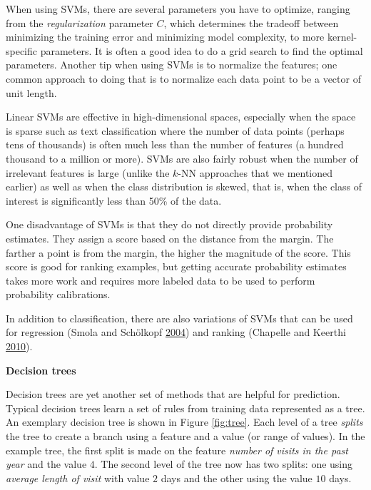 \documentclass[]{krantz}
\begin{document}
When using SVMs, there are several parameters you have to optimize,
ranging from the \emph{regularization} parameter \(C\), which determines
the tradeoff between minimizing the training error and minimizing model
complexity, to more kernel-specific parameters. It is often a good idea
to do a grid search to find the optimal parameters. Another tip when
using SVMs is to normalize the features; one common approach to doing
that is to normalize each data point to be a vector of unit length.

Linear SVMs are effective in high-dimensional spaces, especially when
the space is sparse such as text classification where the number of data
points (perhaps tens of thousands) is often much less than the number of
features (a hundred thousand to a million or more). SVMs are also fairly
robust when the number of irrelevant features is large (unlike the
\(k\)-NN approaches that we mentioned earlier) as well as when the class
distribution is skewed, that is, when the class of interest is
significantly less than 50\% of the data.

One disadvantage of SVMs is that they do not directly provide
probability estimates. They assign a score based on the distance from
the margin. The farther a point is from the margin, the higher the
magnitude of the score. This score is good for ranking examples, but
getting accurate probability estimates takes more work and requires more
labeled data to be used to perform probability calibrations.

In addition to classification, there are also variations of SVMs that
can be used for regression (Smola and Schölkopf
\protect\hyperlink{ref-SmolaRegression04}{2004}) and ranking (Chapelle
and Keerthi \protect\hyperlink{ref-Chapelle2010}{2010}).

\textbf{Decision trees}

Decision trees are yet another set of methods that are helpful for
prediction. Typical decision trees learn a set of rules from training
data represented as a tree. An exemplary decision tree is shown in
Figure \ref{fig:tree}. Each level of a tree \emph{splits} the tree to
create a branch using a feature and a value (or range of values). In the
example tree, the first split is made on the feature \emph{number of
visits in the past year} and the value \(4\). The second level of the
tree now has two splits: one using \emph{average length of visit} with
value \(2\) days and the other using the value \(10\) days.
\end{document}
